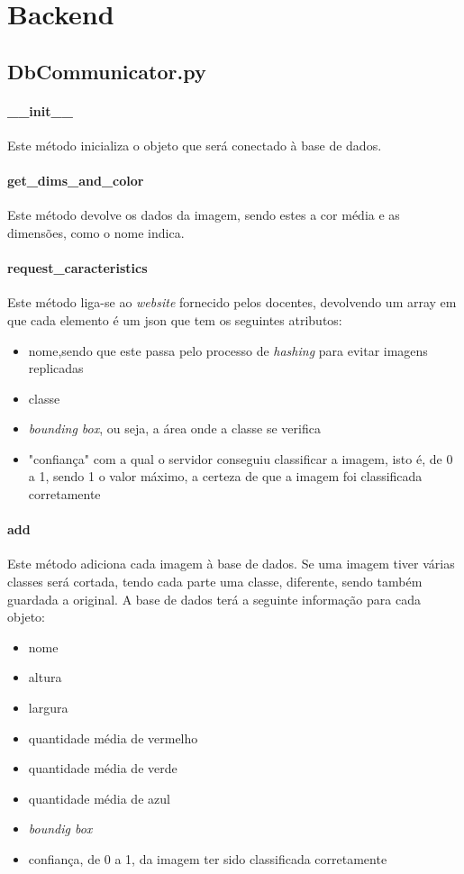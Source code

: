 \documentclass{report}
\begin{document}
\section{Backend}
\subsection{DbCommunicator.py}
\paragraph{\_\_init\_\_}
Este método inicializa o objeto que será conectado à base de dados.

\paragraph{get\_dims\_and\_color}
Este método devolve os dados da imagem, sendo estes a cor média e as dimensões, como o nome indica. 

\paragraph{request\_caracteristics}
Este método liga-se ao \textit{website} fornecido pelos docentes, devolvendo um array em que cada elemento é um json que tem os seguintes atributos:
\begin{itemize}
\item nome,sendo que este passa pelo processo de \textit{hashing} para evitar imagens replicadas
\item classe
\item \textit{bounding box}, ou seja, a área onde a classe se verifica
\item "confiança" com a qual o servidor conseguiu classificar a imagem, isto é, de 0 a 1, sendo 1 o valor máximo, a certeza de que a imagem foi classificada corretamente
\end{itemize}

\paragraph{add}
Este método adiciona cada imagem à base de dados. Se uma imagem tiver várias classes será  cortada, tendo cada parte  uma classe, diferente, sendo também guardada a original. A base de dados terá a seguinte informação para cada objeto:
\begin{itemize}
\item nome
\item altura
\item largura
\item quantidade média de vermelho
\item quantidade média de verde
\item quantidade média de azul
\item \textit{boundig box}
\item confiança, de 0 a 1, da imagem ter sido classificada corretamente
\end{itemize}
\end{document}
